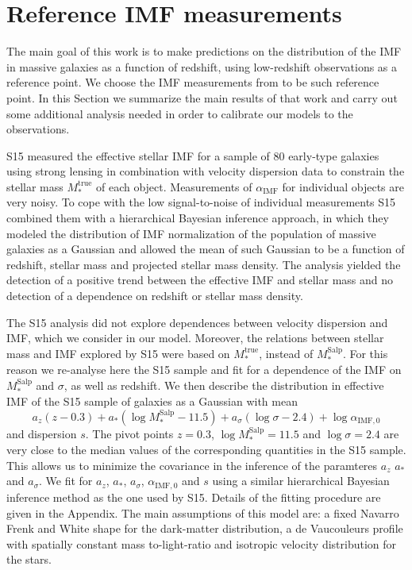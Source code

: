 \documentclass[usenatbib]{mnras}
\def\mtrue{M_*^{\mathrm{true}}}
\def\msalp{M_*^{\mathrm{Salp}}}
\def\aimf{\alpha_{\mathrm{IMF}}}
\begin{document}
\section{Reference IMF measurements}\label{sect:obs}

The main goal of this work is to make predictions on the distribution
of the IMF in massive galaxies as a function of redshift, using
low-redshift observations as a reference point. 
We choose the IMF measurements from \citet[][hereafter S15]{Son++15} to
be such reference point.
In this Section we summarize the main
results of that work and carry out some additional analysis needed in
order to calibrate our models to the observations.

S15 measured the effective stellar IMF for a sample of 80
early-type galaxies using strong lensing in combination with velocity
dispersion data to constrain the stellar mass $\mtrue$ of each object.
Measurements of $\aimf$ for individual objects are very noisy. To cope
with the low signal-to-noise of individual measurements S15 combined
them with a hierarchical Bayesian inference approach, in which they
modeled the distribution of IMF normalization of the population of
massive galaxies as a Gaussian and allowed the mean of such Gaussian
to be a function of redshift, stellar mass and projected stellar mass
density.  The analysis yielded the detection of a positive trend
between the effective IMF and stellar mass and no detection of a
dependence on redshift or stellar mass density.

The S15 analysis did not explore dependences between velocity dispersion and IMF, which we consider in our model.
Moreover, the relations between stellar mass and IMF explored by S15 were based on $\mtrue$, instead of $\msalp$.
For this reason we re-analyse here the S15 sample and fit for a dependence of the IMF on $\msalp$ and $\sigma$, as well as redshift. We then describe the distribution in effective IMF of the S15 sample of galaxies as a Gaussian with mean
\begin{equation}\label{eq:sl2sfit}
a_z(z - 0.3) + a_*(\log{\msalp} - 11.5) + a_\sigma(\log{\sigma} - 2.4) + \log{\alpha_{\mathrm{IMF},0}}
\end{equation}
and dispersion $s$. 
The pivot points $z=0.3$, $\log{\msalp}=11.5$ and $\log{\sigma}=2.4$ are very close to the median values of the corresponding quantities in the S15 sample. This allows us to minimize the covariance in the inference of the paramteres $a_z$ $a_*$ and $a_\sigma$.
%
We fit for $a_z$,
$a_*$, $a_\sigma$, $\alpha_{\mathrm{IMF},0}$ and $s$ using a similar
hierarchical Bayesian inference method as the one used by S15.
Details of the fitting procedure are given in the Appendix.  The main
assumptions of this model are: a fixed Navarro Frenk and White
\citep{NFW97} shape for the dark-matter distribution, a de Vaucouleurs \citep{deV48} profile with spatially constant
mass to-light-ratio and isotropic velocity distribution
for the stars.  
\end{document}
